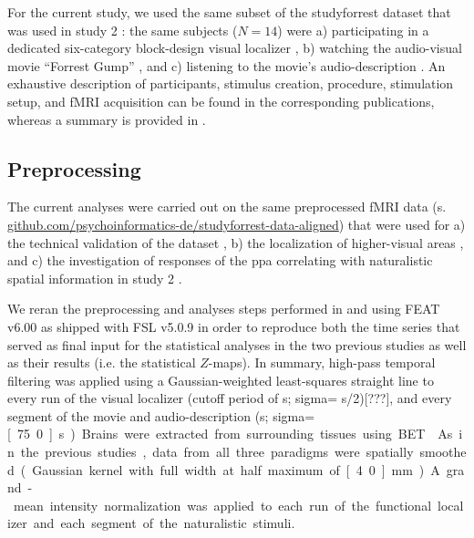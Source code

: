 For the current study, we used the same subset of the studyforrest dataset that
was used in study 2 \citep{haeusler2022processing}:
%
the same subjects ($N=14$) were
a) participating in a dedicated six-category block-design visual localizer
\citep{sengupta2016extension},
b) watching the audio-visual movie ``Forrest Gump''
\citep{hanke2016simultaneous}, and
c) listening to the movie's audio-description \citep{hanke2014audiomovie}.
An exhaustive description of participants, stimulus creation, procedure,
stimulation setup, and fMRI acquisition can be found in the corresponding
publications, whereas a summary is provided in \citet{haeusler2022processing}.



\subsection{Preprocessing}

The current analyses were carried out on the same preprocessed fMRI data (s.
\href{https://github.com/psychoinformatics-de/studyforrest-data-aligned
}{\url{github.com/psychoinformatics-de/studyforrest-data-aligned}}) that were
used for
%
a) the technical validation of the dataset \citep{hanke2016simultaneous},
%
b) the localization of higher-visual areas \citep{sengupta2016extension}, and
%
c) the investigation of responses of the \ac{ppa} correlating with naturalistic
spatial information in study 2 \citep{haeusler2022processing}.

%
We reran the preprocessing and analyses steps performed in
\citet{sengupta2016extension} and \citet{haeusler2022processing} using FEAT
v6.00 \citep[FMRI Expert Analysis Tool;][]{woolrich2001autocorr} as shipped with
FSL v5.0.9 \citep[\href{https://www.fmrib.ox.ac.uk/fsl}{FMRIB's Software
Library;}][]{smith2004fsl} in order to reproduce both the time series that
served as final input for the statistical analyses in the two previous studies
as well as their results (i.e. the statistical $Z$-maps).
In summary, high-pass temporal filtering was applied using a Gaussian-weighted
least-squares straight line to every run of the visual localizer (cutoff period
of \unit[100]{s}; sigma= \unit[100]{s}/2)[???], and every segment of the movie
and audio-description (\unit[150]{s}; sigma=\unit[75.0]{s}).
Brains were extracted from surrounding tissues using BET \citep{smith2002bet}.
As in the previous studies, data from all three paradigms were spatially
smoothed (Gaussian kernel with full width at half maximum of \unit[4.0]{mm}).
A grand-mean intensity normalization was applied to each run of the functional
localizer and each segment of the naturalistic stimuli.


